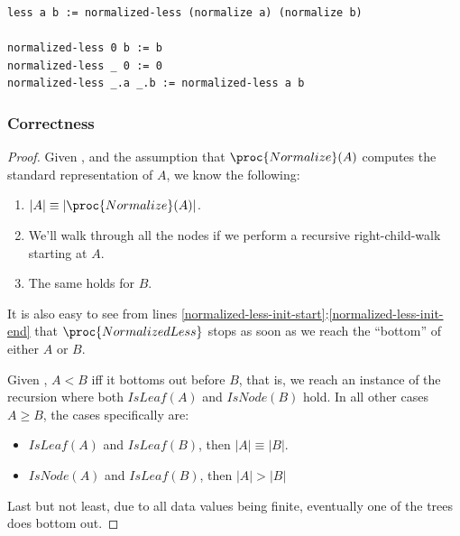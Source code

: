 \begin{lstlisting}[label={listing:d-less},caption={A definition of the \mono{less/2} function.}]
less a b := normalized-less (normalize a) (normalize b)

normalized-less 0 b := b
normalized-less _ 0 := 0
normalized-less _.a _.b := normalized-less a b
\end{lstlisting}

\subsubsection{Correctness}

\begin{proof}

Given , and the assumption that
$\proc{Normalize}(A)$ computes the standard representation of $A$, we know the
following:

\begin{enumerate}

\item $\left|A\right|\equiv\left|\proc{Normalize}(A)\right|$.

\item We'll walk through all the nodes if we perform a recursive
right-child-walk starting at $A$.

\item The same holds for $B$.

\end{enumerate}

It is also easy to see from lines
\ref{normalized-less-init-start}:\ref{normalized-less-init-end} that
$\proc{NormalizedLess}$ stops as soon as we reach the ``bottom'' of either $A$
or $B$.

Given , $A<B$ iff it bottoms out before $B$, that is,
we reach an instance of the recursion where both $IsLeaf(A)$ and $IsNode(B)$
hold.  In all other cases $A\geq B$, the cases specifically are:

\begin{itemize}

\item $IsLeaf(A)$ and $IsLeaf(B)$, then $\left|A\right|\equiv \left|B\right|$.

\item $IsNode(A)$ and $IsLeaf(B)$, then $\left|A\right|>\left|B\right|$

\end{itemize}

Last but not least, due to all data values being finite, eventually one of the
trees does bottom out.

\end{proof}

